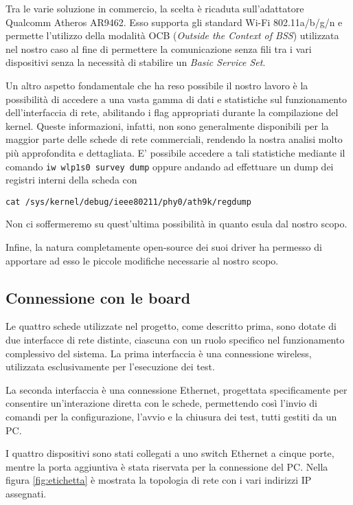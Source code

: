 Tra le varie soluzione in commercio, la scelta è ricaduta sull'adattatore Qualcomm Atheros AR9462. Esso supporta gli standard Wi-Fi 802.11a/b/g/n e permette l'utilizzo della modalità OCB (\textit{Outside the Context of BSS}) utilizzata nel nostro caso al fine di permettere la comunicazione senza fili tra i vari dispositivi senza la necessità di stabilire un \textit{Basic Service Set}.

Un altro aspetto fondamentale che ha reso possibile il nostro lavoro è la possibilità di accedere a una vasta gamma di dati e statistiche sul funzionamento dell'interfaccia di rete, abilitando i flag appropriati durante la compilazione del kernel. Queste informazioni, infatti, non sono generalmente disponibili per la maggior parte delle schede di rete commerciali, rendendo la nostra analisi molto più approfondita e dettagliata. E' possibile accedere a tali statistiche mediante il comando \verb|iw wlp1s0 survey dump| oppure andando ad effettuare un dump dei registri interni della scheda con

\begin{lstlisting}
cat /sys/kernel/debug/ieee80211/phy0/ath9k/regdump
\end{lstlisting}

\noindent Non ci soffermeremo su quest'ultima possibilità in quanto esula dal nostro scopo.

Infine, la natura completamente open-source dei suoi driver ha permesso di apportare ad esso le piccole modifiche necessarie al nostro scopo.

\subsection[Connessione con le board]{Connessione con le board}
Le quattro schede utilizzate nel progetto, come descritto prima, sono dotate di due interfacce di rete distinte, ciascuna con un ruolo specifico nel funzionamento complessivo del sistema. La prima interfaccia è una connessione wireless, utilizzata esclusivamente per l'esecuzione dei test.

La seconda interfaccia è una connessione Ethernet, progettata specificamente per consentire un'interazione diretta con le schede, permettendo così l'invio di comandi per la configurazione, l'avvio e la chiusura dei test, tutti gestiti da un PC.

I quattro dispositivi sono stati collegati a uno switch Ethernet a cinque porte, mentre la porta aggiuntiva è stata riservata per la connessione del PC. Nella figura \ref{fig:etichetta} è mostrata la topologia di rete con i vari indirizzi IP assegnati.

